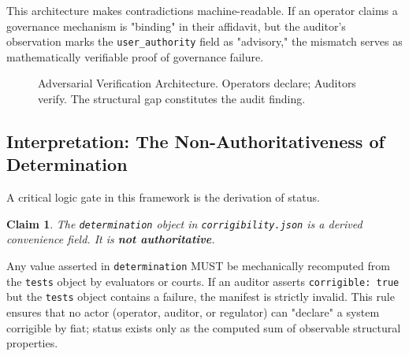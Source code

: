 \documentclass{article}
\newtheorem{claim}{Claim}
\begin{document}
This architecture makes contradictions machine-readable. If an operator claims a governance mechanism is "binding" in their affidavit, but the auditor's observation marks the \texttt{user\_authority} field as "advisory," the mismatch serves as mathematically verifiable proof of governance failure.

\begin{figure}[htbp]
\centering
{}
\caption{Adversarial Verification Architecture. Operators declare; Auditors verify. The structural gap constitutes the audit finding.}
\label{fig:manifests}
\end{figure}

\subsection{Interpretation: The Non-Authoritativeness of Determination}

A critical logic gate in this framework is the derivation of status.

\begin{claim}
The \texttt{determination} object in \texttt{corrigibility.json} is a derived convenience field. It is \textbf{not authoritative}.
\end{claim}

Any value asserted in \texttt{determination} MUST be mechanically recomputed from the \texttt{tests} object by evaluators or courts. If an auditor asserts \texttt{corrigible: true} but the \texttt{tests} object contains a failure, the manifest is strictly invalid. This rule ensures that no actor (operator, auditor, or regulator) can "declare" a system corrigible by fiat; status exists only as the computed sum of observable structural properties.
\end{document}
